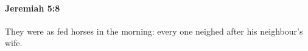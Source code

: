 
		\paragraph{Jeremiah 5:8} %
			\label{JEREMIAH-5-8}

			They were as fed horses in the morning: every one neighed after his neighbour’s wife.


